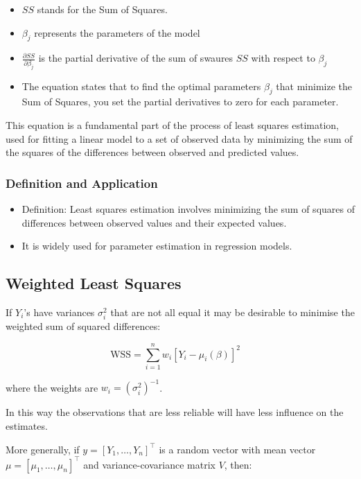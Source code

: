\documentclass[11pt]{article}
\begin{document}
\begin{itemize}
    \item $SS$ stands for the Sum of Squares.
    \item $\beta_j$ represents the parameters of the model
    \item $\frac{\partial SS}{\partial \beta_j}$ is the partial derivative of the sum of swaures $SS$ with respect to $\beta_j$
    \item The equation states that to find the optimal parameters $\beta_j$ that minimize the Sum of Squares, you set the partial derivatives to zero for each parameter.
\end{itemize}

This equation is a fundamental part of the process of least squares estimation, used for fitting a linear model to a set of observed data by minimizing the sum of the squares of the differences between observed and predicted values.

\subsubsection{Definition and Application}

\begin{itemize}
    \item Definition: Least squares estimation involves minimizing the sum of squares of differences between observed values and their expected values.
    \item It is widely used for parameter estimation in regression models.
\end{itemize}

\subsection{Weighted Least Squares}

If $Y_{i}$'s have variances $\sigma_{i}^{2}$ that are not all equal it may be desirable to minimise the weighted sum of squared differences:

\begin{equation}
    \text{WSS} = \sum_{i=1}^{n} w_i [Y_i - \mu_i(\beta)]^2 \quad
\end{equation}

where the weights are $w_i = (\sigma_{i}^{2})^{-1}$.

In this way the observations that are less reliable will have less influence on the estimates.

More generally, if $y = [Y_{1},\dots,Y_{n}]^{\top}$ is a random vector with mean vector $\mu = [\mu_1 ,\dots, \mu_n]^{\top}$ and variance-covariance matrix $V$, then:
\end{document}
